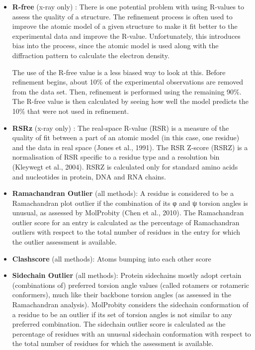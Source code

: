 \documentclass[11pt]{article}
\begin{document}
\begin{itemize}
\item \textbf{R-free} (x-ray only) : There is one potential problem with using R-values to assess the quality of a
structure. The refinement process is often used to improve the atomic model of a given
structure to make it fit better to the experimental data and improve the R-value.
Unfortunately, this introduces bias into the process, since the atomic model is used along
with the diffraction pattern to calculate the electron density. 

The use of the R-free value is a less biased way to look at this. Before refinement begins,
about 10\% of the experimental observations are removed from the data set. Then, refinement
is performed using the remaining 90\%. The R-free value is then calculated by seeing how well
the model predicts the 10\% that were not used in refinement.

\item \textbf{RSRz} (x-ray only) : The real-space R-value (RSR) is a measure of the quality of fit between a part of
an atomic model (in this case, one residue) and the data in real space (Jones et al., 1991).
The RSR Z-score (RSRZ) is a normalisation of RSR specific to a residue type and a resolution
bin (Kleywegt et al., 2004). RSRZ is calculated only for standard amino acids and
nucleotides in protein, DNA and RNA chains.

\item \textbf{Ramachandran Outlier} (all methods): A residue is considered to be a Ramachandran plot outlier if the
combination of its φ and ψ torsion angles is unusual, as assessed by MolProbity (Chen et
al., 2010). The Ramachandran outlier score for an entry is calculated as the percentage of
Ramachandran outliers with respect to the total number of residues in the entry for which
the outlier assessment is available.
\item \textbf{Clashscore} (all methods): Atoms bumping into each other score
\item \textbf{Sidechain Outlier} (all methods): Protein sidechains mostly adopt certain (combinations of) preferred
torsion angle values (called rotamers or rotameric conformers), much like their backbone
torsion angles (as assessed in the Ramachandran analysis). MolProbity considers the
sidechain conformation of a residue to be an outlier if its set of torsion angles is not
similar to any preferred combination. The sidechain outlier score is calculated as the
percentage of residues with an unusual sidechain conformation with respect to the total
number of residues for which the assessment is available.
\end{itemize}
\end{document}
